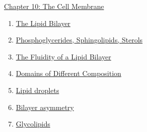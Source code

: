 \documentclass[12pt,letterpaper]{article}
\newcommand{\thetitle}{\hypertarget{home}{Cellular Biology}}
\begin{document}

\clearpage

\renewcommand{\thetitle}{\hypertarget{10}{The Genetic Code of Genes
and Genomes}}
\hypertarget{10}{} 


\begin{chapbox}{\hyperlink{home}{Chapter 10: The Cell Membrane}}
    \begin{enumerate}
        \item \hyperlink{10.1}{The Lipid Bilayer}
        \item \hyperlink{10.2}{Phosphoglycerides, Sphingolipids, Sterols}
        \item \hyperlink{10.3}{The Fluidity of a Lipid Bilayer}
        \item \hyperlink{10.4}{Domains of Different Composition}
        \item \hyperlink{10.5}{Lipid droplets}
        \item \hyperlink{10.6}{Bilayer asymmetry}
        \item \hyperlink{10.7}{Glycolipids}
    \end{enumerate}
\end{chapbox}
\end{document}
